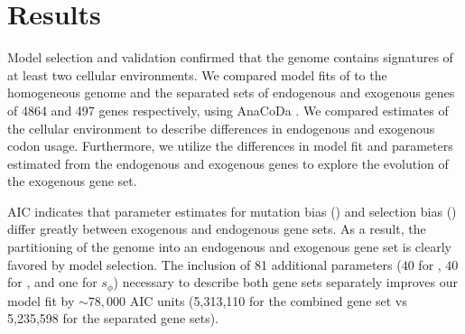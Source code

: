 \documentclass[12pt]{article}
\begin{document}
\section*{Results}
Model selection and validation confirmed that the \kluyveri genome contains signatures of at least two cellular environments.
We compared model fits of \ROC to the homogeneous \kluyveri genome and the separated sets of endogenous and exogenous genes of 4864 and 497 genes respectively, using AnaCoDa \citep{landerer2018}.
We compared estimates of the cellular environment to describe differences in endogenous and exogenous codon usage.
Furthermore, we utilize the differences in model fit and parameters estimated from the endogenous and exogenous genes to explore the evolution of the exogenous gene set.

AIC indicates that parameter estimates for mutation bias (\DM) and selection bias (\DE) differ greatly between exogenous and endogenous gene sets.
As a result, the partitioning of the \kluyveri genome into an endogenous and exogenous gene set is clearly favored by model selection.
The inclusion of 81 additional parameters ($40$ for \DM, $40$ for \DE, and one for $s_{\phi}$) necessary to describe both gene sets separately improves our model fit by $\sim 78,000$ AIC units (5,313,110 for the combined gene set vs 5,235,598 for the separated gene sets).
\end{document}
